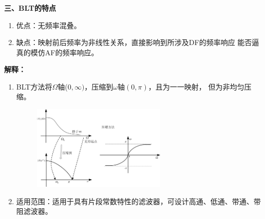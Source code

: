\documentclass[notheorems,compress,mathserif,table]{beamer}
\begin{document}
\begin{frame}[shrink]\frametitle{}%
\textbf{三、BLT的特点}
    \begin{enumerate}
      \item 优点：无频率混叠。
      \item 缺点：映射前后频率为非线性关系，直接影响到所涉及DF的频率响应
          能否逼真的模仿AF的频率响应。
    \end{enumerate}
    \textbf{解释：}
    \begin{enumerate}
      \item
          BLT方法将$\Omega$轴($0,\infty)$，压缩到$\omega$轴$(0,\pi)$，且为一一映射，
          但为非均匀压缩。
          \begin{figure}[h]
               \centering
               \includegraphics[width=0.6\textwidth]{fig21_BLT_feijunyunyasuo.jpg}
          \end{figure}
      \item 适用范围：适用于具有片段常数特性的滤波器，可设计高通、低通、带通、带阻滤波器。
    \end{enumerate}
\end{frame}
\end{document}
